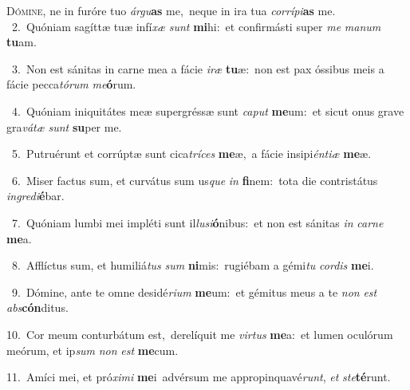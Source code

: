 \lettrine{\initial\textcolor{\initialcolor}{D}}{ómine,} ne in furóre tuo \textit{ár}\-\textit{gu}\textbf{as} me,~\star neque in ira tua \textit{cor}\-\textit{rí}\textit{pi}\textbf{as} me.\\
{\numbfont\textcolor{\numbcolor}{~2.}}~Quóniam sagíttæ tuæ infí\textit{xæ} \textit{sunt} \textbf{mi}\-hi:~\star et confirmásti super \textit{me} \textit{ma}\-\textit{num} \textbf{tu}\-am.\par
{\numbfont\textcolor{\numbcolor}{~3.}}~Non est sánitas in carne mea a fácie \textit{i}\-\textit{ræ} \textbf{tu}\-æ:~\star non est pax óssibus meis a fácie pecca\-\textit{tó}\-\textit{rum} \textit{me}\-\textbf{ó}rum.\par
{\numbfont\textcolor{\numbcolor}{~4.}}~Quóniam iniquitátes meæ supergréssæ sunt \textit{ca}\-\textit{put} \textbf{me}\-um:~\star et sicut onus grave gra\-\textit{vá}\-\textit{tæ} \textit{sunt} \textbf{su}\-per me.\par
{\numbfont\textcolor{\numbcolor}{~5.}}~Putruérunt et corrúptæ sunt cica\-\textit{trí}\-\textit{ces} \textbf{me}\-æ,~\star a fácie insipi\-\textit{én}\-\textit{ti}\textit{æ} \textbf{me}\-æ.\par
{\numbfont\textcolor{\numbcolor}{~6.}}~Miser factus sum, et curvátus sum us\textit{que} \textit{in} \textbf{fi}\-nem:~\star tota die contristátus \textit{in}\-\textit{gre}\textit{di}\textbf{é}bar.\par
{\numbfont\textcolor{\numbcolor}{~7.}}~Quóniam lumbi mei impléti sunt il\-\textit{lu}\-\textit{si}\textbf{ó}nibus:~\star et non est sánitas \textit{in} \textit{car}\-\textit{ne} \textbf{me}\-a.\par
{\numbfont\textcolor{\numbcolor}{~8.}}~Afflíctus sum, et humiliá\textit{tus} \textit{sum} \textbf{ni}\-mis:~\star rugiébam a gémi\textit{tu} \textit{cor}\-\textit{dis} \textbf{me}\-i.\par
{\numbfont\textcolor{\numbcolor}{~9.}}~Dómine, ante te omne desidé\-\textit{ri}\-\textit{um} \textbf{me}\-um:~\star et gémitus meus a te \textit{non} \textit{est} \textit{abs}\-\textbf{cón}ditus.\par
{\numbfont\textcolor{\numbcolor}{10.}}~Cor meum conturbátum est,~\dagger derelíquit me \textit{vir}\-\textit{tus} \textbf{me}\-a:~\star et lumen oculórum meórum, et ip\textit{sum} \textit{non} \textit{est} \textbf{me}\-cum.\par
{\numbfont\textcolor{\numbcolor}{11.}}~Amíci mei, et pró\-\textit{xi}\-\textit{mi} \textbf{me}\-i~\star advérsum me appropinquavé\-\textit{runt}\-, \textit{et} \textit{ste}\-\textbf{té}runt.\par
